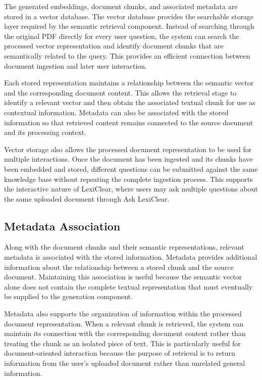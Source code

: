 \documentclass[12pt,a4paper,oneside]{report}
\begin{document}
The generated embeddings, document chunks, and associated metadata are
stored in a vector database. The vector database provides the searchable
storage layer required by the semantic retrieval component. Instead of
searching through the original PDF directly for every user question, the
system can search the processed vector representation and identify document
chunks that are semantically related to the query. This provides an
efficient connection between document ingestion and later user interaction.

Each stored representation maintains a relationship between the semantic
vector and the corresponding document content. This allows the retrieval
stage to identify a relevant vector and then obtain the associated textual
chunk for use as contextual information. Metadata can also be associated
with the stored information so that retrieved content remains connected to
the source document and its processing context.

Vector storage also allows the processed document representation to be used
for multiple interactions. Once the document has been ingested and its
chunks have been embedded and stored, different questions can be submitted
against the same knowledge base without repeating the complete ingestion
process. This supports the interactive nature of LexiClear, where users may
ask multiple questions about the same uploaded document through Ask
LexiClear.

\subsection{Metadata Association}

Along with the document chunks and their semantic representations, relevant
metadata is associated with the stored information. Metadata provides
additional information about the relationship between a stored chunk and
the source document. Maintaining this association is useful because the
semantic vector alone does not contain the complete textual representation
that must eventually be supplied to the generation component.

Metadata also supports the organization of information within the processed
document representation. When a relevant chunk is retrieved, the system can
maintain its connection with the corresponding document content rather than
treating the chunk as an isolated piece of text. This is particularly useful
for document-oriented interaction because the purpose of retrieval is to
return information from the user's uploaded document rather than unrelated
general information.
\end{document}
